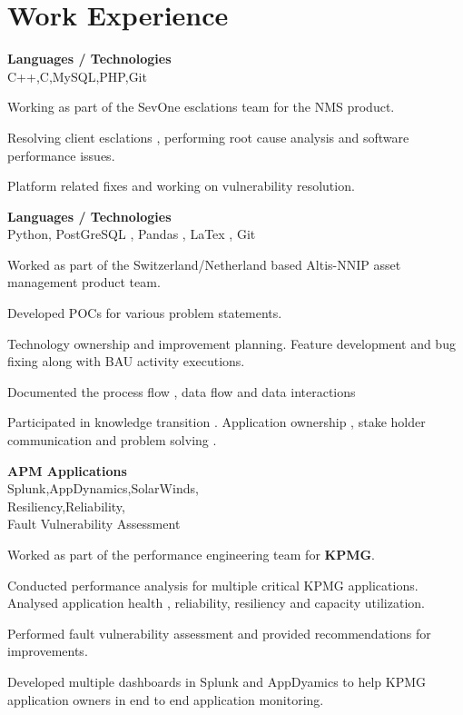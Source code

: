 \documentclass[a4,10pt]{cv4tw}
\begin{document}
\section{Work Experience}
{\textbf{Languages / Technologies} \\C++,C,MySQL,PHP,Git}
	{
	\begin{missions}
	  \item Working as part of the SevOne esclations team for the NMS product.
	  \item Resolving client esclations , performing root cause analysis and software performance issues.
	  \item Platform related fixes and working on vulnerability resolution.
	\end{missions}
}
{\textbf{Languages / Technologies} \\Python, PostGreSQL , Pandas , LaTex , Git}
	{
	\begin{missions}
  \item Worked as part of the Switzerland/Netherland based Altis-NNIP asset management product team.
  \item Developed POCs for various problem statements.
  \item Technology ownership and improvement planning. Feature development and bug fixing along with  BAU activity executions.
  \item Documented the process flow , data flow and data interactions
  \item Participated in knowledge transition . Application ownership , stake holder communication and problem solving .
	\end{missions}
}
{\textbf{APM Applications}  \\Splunk,AppDynamics,SolarWinds,\\Resiliency,Reliability,\\Fault Vulnerability Assessment}
	{
	\begin{missions}
  \item Worked as part of the performance engineering team for \textbf{KPMG}.
  \item Conducted performance analysis for multiple critical KPMG applications. Analysed  application health , reliability, resiliency and capacity utilization.
  \item Performed fault vulnerability assessment and provided recommendations for improvements.
  \item Developed multiple dashboards in Splunk and AppDyamics to help KPMG application owners in end to end application monitoring.
	\end{missions}
}
\end{document}

